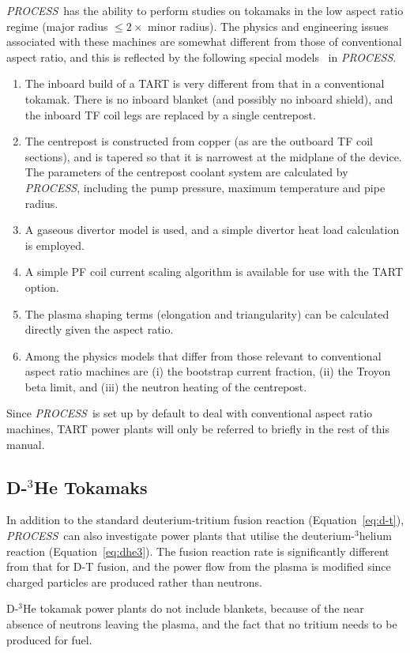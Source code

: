 \documentclass[11pt,a4paper]{report}
\makeatletter
\newcommand{\PS}{\mbox{\it PROCESS\/ }}
\newcommand{\PSD}{\mbox{\it PROCESS}\@.\/ }
\newcommand{\PSC}{\mbox{\it PROCESS},\/ }
\makeatother
\begin{document}
\PS has the ability to perform studies on tokamaks in the low aspect ratio
regime (major radius $\leq 2 \times$ minor radius). The physics and
engineering issues~\cite{tart} associated with these machines are somewhat
different from those of conventional aspect ratio, and this is reflected by
the following special models~\cite{storac} in \PSD
\begin{enumerate}
\item The inboard build of a TART is very different from that in a
conventional tokamak. There is no inboard blanket (and possibly no inboard
shield), and the inboard TF coil legs are replaced by a single centrepost.
\item The centrepost is constructed from copper (as are the outboard TF coil
sections), and is tapered so that it is narrowest at the midplane of the
device. The parameters of the centrepost coolant system are calculated by \PSC
including the pump pressure, maximum temperature and pipe radius.
\item A gaseous divertor model is used, and a simple divertor heat load
calculation is employed.
\item A simple PF coil current scaling algorithm is available for use with the
TART option.
\item The plasma shaping terms (elongation and triangularity) can be
calculated directly given the aspect ratio.
\item Among the physics models that differ from those relevant to conventional
aspect ratio machines are (i) the bootstrap current fraction, (ii) the Troyon
beta limit, and (iii) the neutron heating of the centrepost.
\end{enumerate}
Since \PS is set up by default to deal with conventional aspect ratio
machines, TART power plants will only be referred to briefly in the rest of
this manual.

\subsection{D-$^3$He Tokamaks}

In addition to the standard deuterium-tritium fusion reaction
(Equation~\ref{eq:d-t}), \PS can also investigate power plants that utilise
the deuterium-$^3$helium reaction (Equation~\ref{eq:dhe3}). The fusion
reaction rate is significantly different from that for D-T fusion, and the
power flow from the plasma is modified since charged particles are produced
rather than neutrons.

D-$^3$He tokamak power plants do not include blankets, because of the near
absence of neutrons leaving the plasma, and the fact that no tritium needs to
be produced for fuel.
\end{document}
